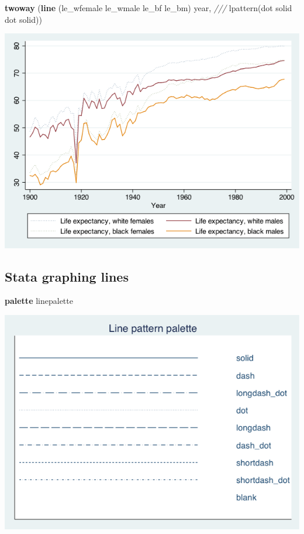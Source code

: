 \documentclass[
]{book}
\newenvironment{Shaded}{\begin{snugshade}}{\end{snugshade}}
\newcommand{\BaseNTok}[1]{\textcolor[rgb]{0.00,0.00,0.81}{#1}}
\newcommand{\CommentTok}[1]{\textcolor[rgb]{0.56,0.35,0.01}{\textit{#1}}}
\newcommand{\FunctionTok}[1]{\textcolor[rgb]{0.00,0.00,0.00}{#1}}
\newcommand{\KeywordTok}[1]{\textcolor[rgb]{0.13,0.29,0.53}{\textbf{#1}}}
\newcommand{\NormalTok}[1]{#1}
\begin{document}
\begin{Shaded}
\begin{Highlighting}[]
\KeywordTok{twoway}\NormalTok{ (}\KeywordTok{line}\NormalTok{ (le\_wfemale le\_wmale le\_bf le\_bm) }\FunctionTok{year}\NormalTok{, }\CommentTok{///}
\NormalTok{       lpattern(}\BaseNTok{dot}\NormalTok{ solid }\BaseNTok{dot}\NormalTok{ solid))}
\end{Highlighting}
\end{Shaded}

\includegraphics{Stata/StataGraphics/images/linegraph2.png}

\hypertarget{stata-graphing-lines}{%
\subsection{Stata graphing lines}\label{stata-graphing-lines}}

\begin{Shaded}
\begin{Highlighting}[]
\KeywordTok{palette}\NormalTok{ linepalette}
\end{Highlighting}
\end{Shaded}

\includegraphics{Stata/StataGraphics/images/linepalette.png}
\end{document}
